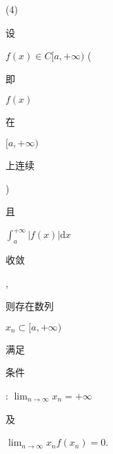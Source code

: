 \documentclass[10pt]{article}
\begin{document}
(4) \begin{CJK}{UTF8}{mj}设\end{CJK} $f(x) \in C[a,+\infty)$ (\begin{CJK}{UTF8}{mj}即\end{CJK} $f(x)$ \begin{CJK}{UTF8}{mj}在\end{CJK} $[a,+\infty)$ \begin{CJK}{UTF8}{mj}上连续\end{CJK}) \begin{CJK}{UTF8}{mj}且\end{CJK} $\int_{a}^{+\infty}|f(x)| \mathrm{d} x$ \begin{CJK}{UTF8}{mj}收敛\end{CJK}, \begin{CJK}{UTF8}{mj}则存在数列\end{CJK} $x_{n} \subset[a,+\infty)$ \begin{CJK}{UTF8}{mj}满足\end{CJK} \begin{CJK}{UTF8}{mj}条件\end{CJK}: $\lim _{n \rightarrow \infty} x_{n}=+\infty$ \begin{CJK}{UTF8}{mj}及\end{CJK} $\lim _{n \rightarrow \infty} x_{n} f\left(x_{n}\right)=0$.
\end{document}
